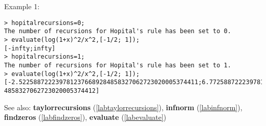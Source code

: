 \noindent Example 1: 
\begin{center}\begin{minipage}{15cm}\begin{Verbatim}[frame=single]
> hopitalrecursions=0;
The number of recursions for Hopital's rule has been set to 0.
> evaluate(log(1+x)^2/x^2,[-1/2; 1]);
[-infty;infty]
> hopitalrecursions=1;
The number of recursions for Hopital's rule has been set to 1.
> evaluate(log(1+x)^2/x^2,[-1/2; 1]);
[-2.5225887222397812376689284858327062723020005374411;6.772588722239781237668928
4858327062723020005374412]
\end{Verbatim}
\end{minipage}\end{center}
See also: \textbf{taylorrecursions} (\ref{labtaylorrecursions}), \textbf{infnorm} (\ref{labinfnorm}), \textbf{findzeros} (\ref{labfindzeros}), \textbf{evaluate} (\ref{labevaluate})
